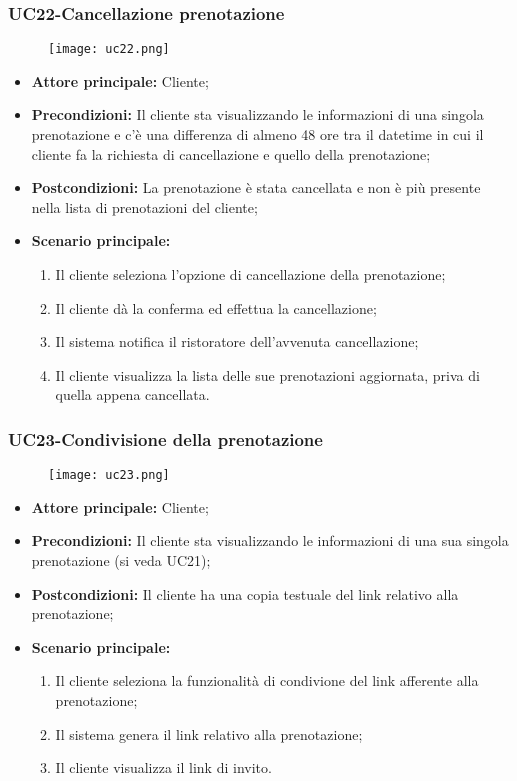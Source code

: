 \subsubsection{UC22-Cancellazione prenotazione}
\begin{figure}[h] \texttt{[image: uc22.png]} \end{figure}
\begin{itemize}
    \item \textbf{Attore principale:} Cliente;
    \item \textbf{Precondizioni:} Il cliente sta visualizzando le informazioni di una singola prenotazione e c'è una differenza di almeno 48 ore tra il datetime in cui il cliente fa la richiesta di cancellazione e quello della prenotazione;
    \item \textbf{Postcondizioni:} La prenotazione è stata cancellata e non è più presente nella lista di prenotazioni del cliente;
    \item \textbf{Scenario principale:}
        \begin{enumerate}
            \item Il cliente seleziona l'opzione di cancellazione della prenotazione;
            \item Il cliente dà la conferma ed effettua la cancellazione;
            \item Il sistema notifica il ristoratore dell'avvenuta cancellazione;
            \item Il cliente visualizza la lista delle sue prenotazioni aggiornata, priva di quella appena cancellata.
        \end{enumerate}
\end{itemize}

\subsubsection{UC23-Condivisione della prenotazione}
\begin{figure}[h] \texttt{[image: uc23.png]} \end{figure}
\begin{itemize}
    \item \textbf{Attore principale:} Cliente;
    \item \textbf{Precondizioni:} Il cliente sta visualizzando le informazioni di una sua singola prenotazione (si veda UC21);
    \item \textbf{Postcondizioni:} Il cliente ha una copia testuale del link relativo alla prenotazione;
    \item \textbf{Scenario principale:}
        \begin{enumerate}
            \item Il cliente seleziona la funzionalità di condivione del link afferente alla prenotazione;
            \item Il sistema genera il link relativo alla prenotazione;
            \item Il cliente visualizza il link di invito.
        \end{enumerate}
\end{itemize}


